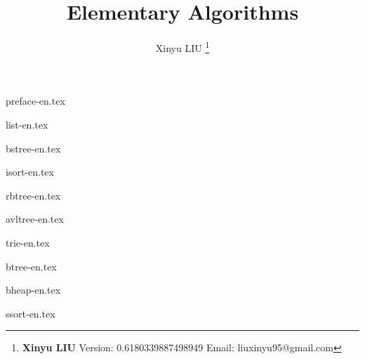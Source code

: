\documentclass[b5paper,twoside]{book}
\begin{document}


\title{
  {\bf \Huge Elementary Algorithms}
  \centering
}

\author{Xinyu LIU
  \thanks{{\bfseries Xinyu LIU} \newline
    Version: 0.6180339887498949 \newline
    Email: liuxinyu95@gmail.com \newline
}}

\maketitle


\tableofcontents
\newpage

{preface-en.tex}

{list-en.tex}

{bstree-en.tex}

{isort-en.tex}

{rbtree-en.tex}

{avltree-en.tex}

{trie-en.tex}

{btree-en.tex}

{bheap-en.tex}

{ssort-en.tex}
\end{document}

